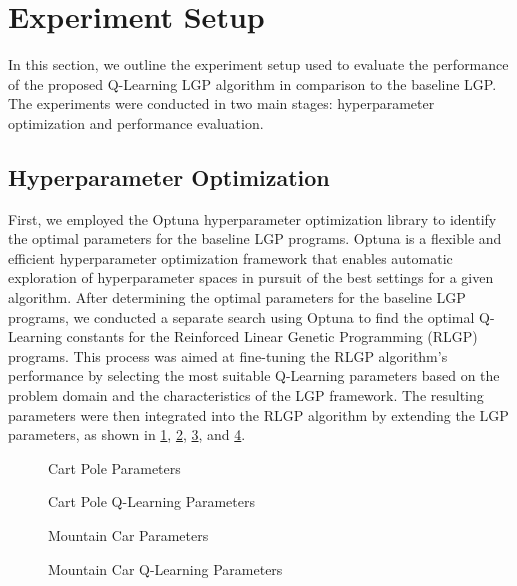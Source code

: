 \documentclass[12pt]{report}
\begin{document}
\section{Experiment Setup}

In this section, we outline the experiment setup used to evaluate the performance of the proposed Q-Learning LGP algorithm in comparison to the baseline LGP. The experiments were conducted in two main stages: hyperparameter optimization and performance evaluation.

\subsection{Hyperparameter Optimization}
First, we employed the Optuna hyperparameter optimization library \cite{akiba2019optuna} to identify the optimal parameters for the baseline LGP programs.
Optuna is a flexible and efficient hyperparameter optimization framework that enables automatic exploration of hyperparameter spaces in pursuit of the best settings for a given algorithm.
After determining the optimal parameters for the baseline LGP programs, we conducted a separate search using Optuna to find the optimal Q-Learning constants for the Reinforced Linear Genetic Programming (RLGP) programs.
This process was aimed at fine-tuning the RLGP algorithm's performance by selecting the most suitable Q-Learning parameters based on the problem domain and the characteristics of the LGP framework.
The resulting parameters were then integrated into the RLGP algorithm by extending the LGP parameters, as shown in \ref{code:cart-pole-parameters}, \ref{code:cart-pole-q-parameters}, \ref{code:mountain-car-parameters}, and \ref{code:mountain-car-q-parameters}.

\begin{figure}[!htb]
	\centering
	
	\caption{Cart Pole Parameters}
	\label{code:cart-pole-parameters}
\end{figure}
\begin{figure}[!htb]
	\centering
	
	\caption{Cart Pole Q-Learning Parameters}
	\label{code:cart-pole-q-parameters}
\end{figure}
\begin{figure}[!htb]
	\centering
	
	\caption{Mountain Car Parameters}
	\label{code:mountain-car-parameters}
\end{figure}
\begin{figure}[!htb]
	\centering
	
	\caption{Mountain Car Q-Learning Parameters}
	\label{code:mountain-car-q-parameters}
\end{figure}
\end{document}
